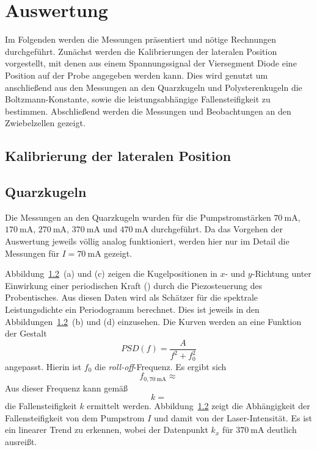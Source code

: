 \section{Auswertung}
Im Folgenden werden die Messungen präsentiert und nötige Rechnungen durchgeführt. Zunächst
werden die Kalibrierungen der lateralen Position vorgestellt, mit denen aus einem Spannungssignal der
Viersegment Diode eine Position auf der Probe angegeben werden kann. Dies wird genutzt um anschließend
aus den Messungen an den Quarzkugeln und Polysterenkugeln die Boltzmann-Konstante, sowie die leistungsabhängige
Fallensteifigkeit zu bestimmen. Abschließend werden die Messungen und Beobachtungen an den Zwiebelzellen
gezeigt.

\subsection{Kalibrierung der lateralen Position}


\subsection{Quarzkugeln}
Die Messungen an den Quarzkugeln wurden für die Pumpstromstärken $\SI{70}{\milli\ampere}$, $\SI{170}{\milli\ampere}$,
$\SI{270}{\milli\ampere}$, $\SI{370}{\milli\ampere}$ und $\SI{470}{\milli\ampere}$ durchgeführt. Da das Vorgehen der Auswertung
jeweils völlig analog funktioniert, werden hier nur im Detail die Messungen für $I = \SI{70}{\milli\ampere}$ gezeigt.

Abbildung~\ref{}~(a) und (c) zeigen die Kugelpositionen in $x$- und $y$-Richtung unter Einwirkung
einer periodischen Kraft () durch die Piezosteuerung des Probentisches.
Aus diesen Daten wird als Schätzer für die spektrale Leistungsdichte
ein Periodogramm berechnet. Dies ist jeweils in den Abbildungen~\ref{}~(b) und (d) einzusehen. Die Kurven werden
an eine Funktion der Gestalt
\begin{equation}
  PSD(f) = \frac{A}{f^2 + f_0^2}
\end{equation}
angepasst. Hierin ist $f_0$ die \emph{roll-off}-Frequenz. Es ergibt sich
\begin{equation}
  f_{0, \SI{70}{\milli\ampere}} \approx
\end{equation}
Aus dieser Frequenz kann gemäß
\begin{equation}
  k =
\end{equation}
die Fallensteifigkeit $k$ ermittelt werden. Abbildung~\ref{} zeigt die Abhängigkeit der Fallensteifigkeit von dem
Pumpstrom $I$ und damit von der Laser-Intensität. Es ist ein linearer Trend zu erkennen, wobei der Datenpunkt $k_x$
für $\SI{370}{\milli\ampere}$ deutlich ausreißt.

